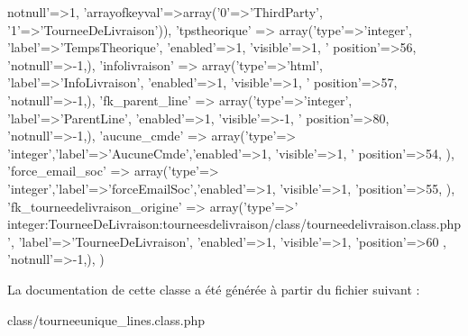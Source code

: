 \begin{DoxyCode}
{      notnull'}=>1, \textcolor{stringliteral}{'arrayofkeyval'}=>array(\textcolor{charliteral}{'0'}=>\textcolor{stringliteral}{'ThirdParty'}, \textcolor{charliteral}{'1'}=>\textcolor{stringliteral}{'TourneeDeLivraison'})),
        \textcolor{stringliteral}{'tpstheorique'} => array(\textcolor{stringliteral}{'type'}=>\textcolor{stringliteral}{'integer'}, \textcolor{stringliteral}{'label'}=>\textcolor{stringliteral}{'TempsTheorique'}, \textcolor{stringliteral}{'enabled'}=>1, \textcolor{stringliteral}{'visible'}=>1, \textcolor{stringliteral}{'
      position'}=>56, \textcolor{stringliteral}{'notnull'}=>-1,),
        \textcolor{stringliteral}{'infolivraison'} => array(\textcolor{stringliteral}{'type'}=>\textcolor{stringliteral}{'html'}, \textcolor{stringliteral}{'label'}=>\textcolor{stringliteral}{'InfoLivraison'}, \textcolor{stringliteral}{'enabled'}=>1, \textcolor{stringliteral}{'visible'}=>1, \textcolor{stringliteral}{'
      position'}=>57, \textcolor{stringliteral}{'notnull'}=>-1,),
        \textcolor{stringliteral}{'fk\_parent\_line'} => array(\textcolor{stringliteral}{'type'}=>\textcolor{stringliteral}{'integer'}, \textcolor{stringliteral}{'label'}=>\textcolor{stringliteral}{'ParentLine'}, \textcolor{stringliteral}{'enabled'}=>1, \textcolor{stringliteral}{'visible'}=>-1, \textcolor{stringliteral}{'
      position'}=>80, \textcolor{stringliteral}{'notnull'}=>-1,),
        \textcolor{stringliteral}{'aucune\_cmde'} => array(\textcolor{stringliteral}{'type'}=> \textcolor{stringliteral}{'integer'},\textcolor{stringliteral}{'label'}=>\textcolor{stringliteral}{'AucuneCmde'},\textcolor{stringliteral}{'enabled'}=>1, \textcolor{stringliteral}{'visible'}=>1, \textcolor{stringliteral}{'
      position'}=>54, ),
        \textcolor{stringliteral}{'force\_email\_soc'} => array(\textcolor{stringliteral}{'type'}=> \textcolor{stringliteral}{'integer'},\textcolor{stringliteral}{'label'}=>\textcolor{stringliteral}{'forceEmailSoc'},\textcolor{stringliteral}{'enabled'}=>1, \textcolor{stringliteral}{'visible'}=>1, \textcolor{stringliteral}{
      'position'}=>55, ),
        \textcolor{stringliteral}{'fk\_tourneedelivraison\_origine'} => array(\textcolor{stringliteral}{'type'}=>\textcolor{stringliteral}{'
      integer:TourneeDeLivraison:tourneesdelivraison/class/tourneedelivraison.class.php'}, \textcolor{stringliteral}{'label'}=>\textcolor{stringliteral}{'TourneeDeLivraison'}, \textcolor{stringliteral}{'enabled'}=>1, \textcolor{stringliteral}{'visible'}=>1, \textcolor{stringliteral}{'position'}=>60
      , \textcolor{stringliteral}{'notnull'}=>-1,),
    )
\end{DoxyCode}


La documentation de cette classe a été générée à partir du fichier suivant \+:\begin{DoxyCompactItemize}
\item 
class/tourneeunique\+\_\+lines.\+class.\+php\end{DoxyCompactItemize}
